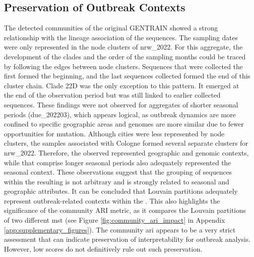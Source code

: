 \subsection{Preservation of Outbreak Contexts}
The detected communities of the original GENTRAIN  showed a strong relationship with the lineage association of the sequences. The sampling dates were only represented in the node clusters of nrw\_2022. For this aggregate, the development of the clades and the order of the sampling months could be traced by following the edges between node clusters. Sequences that were collected the first formed the beginning, and the last sequences collected formed the end of this cluster chain. Clade 22D was the only exception to this pattern. It emerged at the end of the observation period but was still linked to earlier collected sequences. These findings were not observed for aggregates of shorter seasonal periods (due\_202203), which appears logical, as outbreak dynamics are more confined to specific geographic areas and genomes are more similar due to fewer opportunities for mutation. Although cities were less represented by node clusters, the samples associated with Cologne formed several separate clusters for nrw\_2022. Therefore, the observed  represented geographic and genomic contexts, while  that comprise longer seasonal periods also adequately represented the seasonal context. These observations suggest that the grouping of sequences within the resulting  is not arbitrary and is strongly related to seasonal and geographic attributes. It can be concluded that Louvain partitions adequately represent outbreak-related contexts within the . This also highlights the significance of the community ARI metric, as it compares the Louvain partitions of two different \acrshort{mst} (see Figure \ref{fig:community_ari_impact} in Appendix \ref{app:supplementary_figures}). The community \acrshort{ari} appears to be a very strict assessment that can indicate preservation of interpretability for outbreak analysis. However, low scores do not definitively rule out such preservation.

